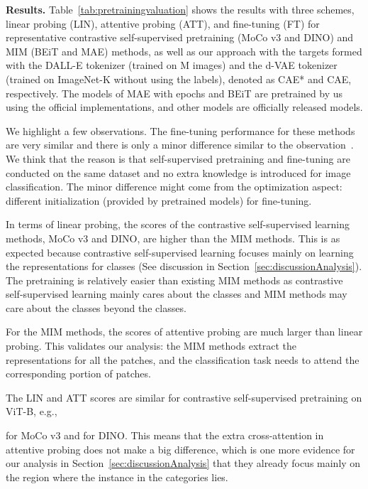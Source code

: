 \documentclass[twocolumn]{svjour3}          \smartqed  \usepackage{graphicx}
\begin{document}
\vspace{1mm}
\noindent\textbf{Results.}
Table~\ref{tab:pretrainingvaluation}
shows the results 
with three schemes,
linear probing (LIN),
attentive probing (ATT),
and fine-tuning (FT)
for representative contrastive self-supervised pretraining
(MoCo v3 and DINO)
and MIM (BEiT and MAE) methods,
as well as our approach
with the targets
formed with the DALL-E tokenizer
(trained on M images)
and the d-VAE tokenizer
(trained on ImageNet-K without using the labels),
denoted as CAE* and CAE, respectively.
The models of MAE with  epochs
and BEiT
are pretrained by us
using the official implementations,
and other models are officially released models.

We highlight a few observations.
The fine-tuning performance
for these methods are very similar
and there is only a minor difference
similar to the observation~\cite{zhou2021ibot}.
We think that
the reason is that
self-supervised pretraining 
and fine-tuning are conducted
on the same dataset
and no extra knowledge
is introduced for image classification.
The minor difference might come from the optimization aspect:
different initialization
(provided by pretrained models)
for fine-tuning.







In terms of linear probing,
the scores of the contrastive self-supervised learning methods,
MoCo v3 and DINO, are higher than the MIM methods.
This is as expected because 
contrastive self-supervised learning focuses mainly on
learning the representations for  classes
(See discussion in Section~\ref{sec:discussionAnalysis}).
The pretraining is relatively easier 
than existing MIM methods
as contrastive self-supervised learning mainly cares about the  classes
and MIM methods may care about the classes
beyond the  classes.





For the MIM methods,
the scores of attentive probing
are much larger
than linear probing.
This validates our analysis:
the MIM methods extract the representations
for all the patches,
and the classification task
needs to attend the corresponding portion of patches. 


The LIN and ATT scores are similar
for contrastive self-supervised pretraining on ViT-B, e.g.,

for MoCo v3
and  for DINO.
This means that the extra cross-attention in attentive probing
does not make a big difference,
which is one more evidence for our analysis in Section~\ref{sec:discussionAnalysis} that
they already focus
mainly 
on the region where the instance in the  categories lies.
\end{document}
